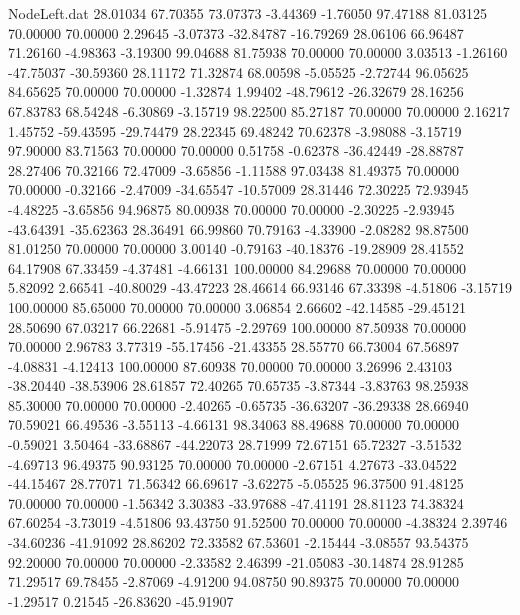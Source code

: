 \begin{filecontents}{NodeLeft.dat}
  28.01034   67.70355   73.07373    -3.44369   -1.76050   97.47188   81.03125   70.00000   70.00000    2.29645   -3.07373  -32.84787  -16.79269
  28.06106   66.96487   71.26160    -4.98363   -3.19300   99.04688   81.75938   70.00000   70.00000    3.03513   -1.26160  -47.75037  -30.59360
  28.11172   71.32874   68.00598    -5.05525   -2.72744   96.05625   84.65625   70.00000   70.00000   -1.32874    1.99402  -48.79612  -26.32679
  28.16256   67.83783   68.54248    -6.30869   -3.15719   98.22500   85.27187   70.00000   70.00000    2.16217    1.45752  -59.43595  -29.74479
  28.22345   69.48242   70.62378    -3.98088   -3.15719   97.90000   83.71563   70.00000   70.00000    0.51758   -0.62378  -36.42449  -28.88787
  28.27406   70.32166   72.47009    -3.65856   -1.11588   97.03438   81.49375   70.00000   70.00000   -0.32166   -2.47009  -34.65547  -10.57009
  28.31446   72.30225   72.93945    -4.48225   -3.65856   94.96875   80.00938   70.00000   70.00000   -2.30225   -2.93945  -43.64391  -35.62363
  28.36491   66.99860   70.79163    -4.33900   -2.08282   98.87500   81.01250   70.00000   70.00000    3.00140   -0.79163  -40.18376  -19.28909
  28.41552   64.17908   67.33459    -4.37481   -4.66131  100.00000   84.29688   70.00000   70.00000    5.82092    2.66541  -40.80029  -43.47223
  28.46614   66.93146   67.33398    -4.51806   -3.15719  100.00000   85.65000   70.00000   70.00000    3.06854    2.66602  -42.14585  -29.45121
  28.50690   67.03217   66.22681    -5.91475   -2.29769  100.00000   87.50938   70.00000   70.00000    2.96783    3.77319  -55.17456  -21.43355
  28.55770   66.73004   67.56897    -4.08831   -4.12413  100.00000   87.60938   70.00000   70.00000    3.26996    2.43103  -38.20440  -38.53906
  28.61857   72.40265   70.65735    -3.87344   -3.83763   98.25938   85.30000   70.00000   70.00000   -2.40265   -0.65735  -36.63207  -36.29338
  28.66940   70.59021   66.49536    -3.55113   -4.66131   98.34063   88.49688   70.00000   70.00000   -0.59021    3.50464  -33.68867  -44.22073
  28.71999   72.67151   65.72327    -3.51532   -4.69713   96.49375   90.93125   70.00000   70.00000   -2.67151    4.27673  -33.04522  -44.15467
  28.77071   71.56342   66.69617    -3.62275   -5.05525   96.37500   91.48125   70.00000   70.00000   -1.56342    3.30383  -33.97688  -47.41191
  28.81123   74.38324   67.60254    -3.73019   -4.51806   93.43750   91.52500   70.00000   70.00000   -4.38324    2.39746  -34.60236  -41.91092
  28.86202   72.33582   67.53601    -2.15444   -3.08557   93.54375   92.20000   70.00000   70.00000   -2.33582    2.46399  -21.05083  -30.14874
  28.91285   71.29517   69.78455    -2.87069   -4.91200   94.08750   90.89375   70.00000   70.00000   -1.29517    0.21545  -26.83620  -45.91907

\end{filecontents}
